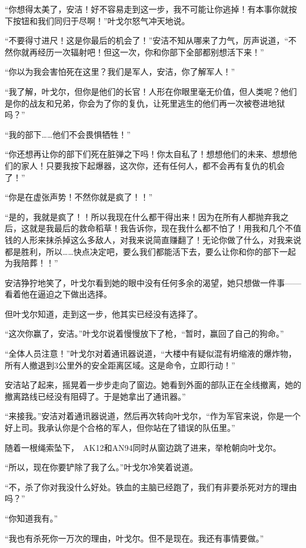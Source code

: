 “你想得太美了，安洁！好不容易走到这一步，我不可能让你逃掉！有本事你就按下按钮和我们同归于尽啊！”叶戈尔怒气冲天地说。

“不要得寸进尺！这是你最后的机会了！”安洁不知从哪来了力气，厉声说道，“不然你就再经历一次辐射吧！但这一次，你和你部下全部都别想活下来！”

“你以为我会害怕死在这里？我们是军人，安洁，你了解军人！”

“我了解，叶戈尔，但你是他们的长官！人形在你眼里毫无价值，但人类呢？他们是你的战友和兄弟，你会为了你的复仇，让死里逃生的他们再一次被卷进地狱吗？”

“我的部下……他们不会畏惧牺牲！”

“你还想再让你的部下们死在脏弹之下吗！你太自私了！想想他们的未来、想想他们的家人！只要我按下起爆器，这次你，还有任何人，都不会再有复仇的机会了！”

“你是在虚张声势！不然你就是疯了！！”

“是的，我就是疯了！！所以我现在什么都干得出来！因为在所有人都抛弃我之后，这就是我最后的救命稻草！我告诉你，现在我什么都不怕了！用我和几个不值钱的人形来抹杀掉这么多敌人，对我来说简直赚翻了！无论你做了什么，对我来说都是胜利，所以……快点决定吧，要么我们都能活下去，要么让你和你的部下一起为我陪葬！！”

安洁狰狞地笑了，叶戈尔看到她的眼中没有任何多余的渴望，她只想做一件事——看着他在逼迫之下做出选择。

但叶戈尔知道，走到这一步，他其实已经没有选择了。

“这次你赢了，安洁。”叶戈尔说着慢慢放下了枪，“暂时，赢回了自己的狗命。”

“全体人员注意！”叶戈尔对着通讯器说道，“大楼中有疑似混有坍缩液的爆炸物，所有人撤退到3公里外的安全距离区域。这是命令，立即行动！”

安洁站了起来，摇晃着一步步走向了窗边。她看到外面的部队正在全线撤离，她的撤离路线已经没有阻碍了。于是她拿出了通讯器。”

“来接我。”安洁对着通讯器说道，然后再次转向叶戈尔，“作为军官来说，你是一个好上司。我承认你是个合格的军人，但你站在了错误的队伍里。”

随着一根绳索坠下， AK12和AN94同时从窗边跳了进来，举枪朝向叶戈尔。

“所以，现在你要铲除了我了么。”叶戈尔冷笑着说道。

“不，杀了你对我没什么好处。铁血的主脑已经跑了，我们有非要杀死对方的理由吗？”

“你知道我有。”

“我也有杀死你一万次的理由，叶戈尔。但不是现在。我还有事情要做。”

